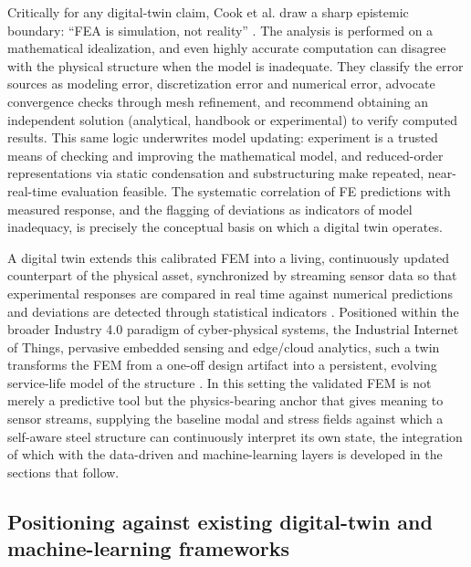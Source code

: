 Critically for any digital-twin claim, Cook et al. draw a sharp epistemic boundary: ``FEA is simulation, not reality'' \citep{cook2002fea}. The analysis is performed on a mathematical idealization, and even highly accurate computation can disagree with the physical structure when the model is inadequate. They classify the error sources as modeling error, discretization error and numerical error, advocate convergence checks through mesh refinement, and recommend obtaining an independent solution (analytical, handbook or experimental) to verify computed results. This same logic underwrites model updating: experiment is a trusted means of checking and improving the mathematical model, and reduced-order representations via static condensation and substructuring make repeated, near-real-time evaluation feasible. The systematic correlation of FE predictions with measured response, and the flagging of deviations as indicators of model inadequacy, is precisely the conceptual basis on which a digital twin operates.

A digital twin extends this calibrated FEM into a living, continuously updated counterpart of the physical asset, synchronized by streaming sensor data so that experimental responses are compared in real time against numerical predictions and deviations are detected through statistical indicators \citep{chiachio2022structural,mariniello2025enhancing}. Positioned within the broader Industry 4.0 paradigm of cyber-physical systems, the Industrial Internet of Things, pervasive embedded sensing and edge/cloud analytics, such a twin transforms the FEM from a one-off design artifact into a persistent, evolving service-life model of the structure \citep{zou2026deep,li2025edge,he2022integrated}. In this setting the validated FEM is not merely a predictive tool but the physics-bearing anchor that gives meaning to sensor streams, supplying the baseline modal and stress fields against which a self-aware steel structure can continuously interpret its own state, the integration of which with the data-driven and machine-learning layers is developed in the sections that follow.

\subsection{Positioning against existing digital-twin and machine-learning frameworks}\label{subsec:positioning}

